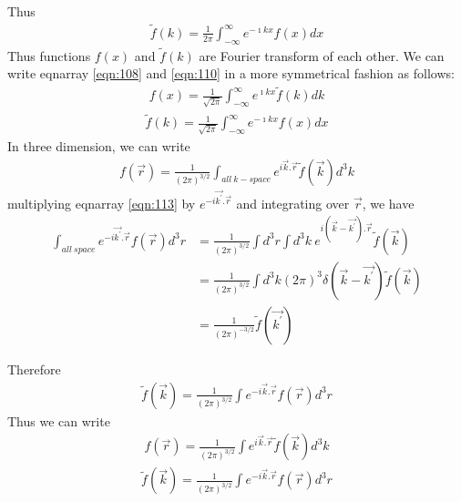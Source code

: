 		Thus
		\begin{eqnarray}\label{eqn:110}
			\tilde{f}(k) = \frac{1}{2\pi} \int_{-\infty}^{\infty} e^{-\imath k x} f(x) dx
		\end{eqnarray}
		Thus functions $f(x)$ and $\tilde{f}(k)$ are Fourier transform of each other. We can write eqnarray \ref{eqn:108} and \ref{eqn:110} in a more symmetrical fashion as follows:
		\begin{eqnarray}\label{eqn:111}
		f(x) = \frac{1}{\sqrt{2\pi}} \int_{-\infty}^{\infty} e^{\imath k x} \tilde{f}(k) dk
		\end{eqnarray}
		\begin{eqnarray}\label{eqn:112}
			\tilde{f}(k) = \frac{1}{\sqrt{2\pi}} \int_{-\infty}^{\infty} e^{-\imath k x} f(x) dx
		\end{eqnarray}
		In three dimension, we can write
		\begin{eqnarray}\label{eqn:113}
			f(\vec{r}) = \frac{1}{(2\pi)^{3/2}} \int_{all\ k-space} e^{i \vec{k} . \vec{r}} \tilde{f}(\vec{k}) d^3k
		\end{eqnarray}
		multiplying eqnarray \ref{eqn:113} by $e^{-i\vec{k^\prime} . \vec{r}} $ and integrating over $\vec{r}$, we have
		\begin{eqnarray}\label{eqn:114}
			\int_{all\ space} e^{-i\vec{k^\prime} . \vec{r}} f(\vec{r}) d^3 r
			&= \frac{1}{(2\pi)^{3/2}} \int d^3 r \int d^3 k \ e^{i (\vec{k} - \vec{k^\prime}). \vec{r}} \tilde{f}(\vec{k}) \nonumber \\
			&= \frac{1}{(2\pi)^{3/2}} \int d^3 k (2\pi)^3 \delta(\vec{k} - \vec{k^\prime}) \tilde{f}(\vec{k}) \nonumber \\
			&= \frac{1}{(2\pi)^{-3/2}} \tilde{f}(\vec{k^\prime})
		\end{eqnarray}
		
		Therefore
		\begin{eqnarray}\label{eqn:115}
			\tilde{f}(\vec{k}) = \frac{1}{(2\pi)^{3/2}} \int e^{-i\vec{k} . \vec{r}} f(\vec{r}) d^3 r
		\end{eqnarray}
		Thus we can write 
		\begin{eqnarray}\label{eqn:116}
		f(\vec{r}) = \frac{1}{(2\pi)^{3/2}} \int e^{i\vec{k} . \vec{r}} \tilde{f}(\vec{k}) d^3 k
		\end{eqnarray}
		\begin{eqnarray}\label{eqn:117}
		\tilde{f}(\vec{k}) = \frac{1}{(2\pi)^{3/2}} \int e^{-i\vec{k} . \vec{r}} f(\vec{r}) d^3 r
		\end{eqnarray}
		
